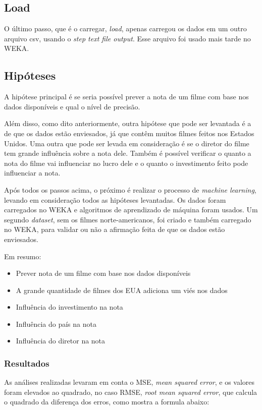 \subsection{Load}
O último passo, que é o carregar, \textit{load}, apenas carregou os dados em um outro arquivo csv, usando o \textit{step text file output}. Esse arquivo foi usado mais tarde no WEKA.

\subsection{Hipóteses}
A hipótese principal é se seria possível prever a nota de um filme com base nos dados disponíveis e qual o nível de precisão.

Além disso, como dito anteriormente, outra hipótese que pode ser levantada é a de que os dados estão enviesados, já que contêm muitos filmes feitos nos Estados Unidos. Uma outra que pode ser levada em consideração é se o diretor do filme tem grande influência sobre a nota dele. Também é possível verificar o quanto a nota do filme vai influenciar no lucro dele e o quanto o investimento feito pode influenciar a nota.

Após todos os passos acima, o próximo é realizar o processo de \textit{machine learning}, levando em consideração todos as hipóteses levantadas. Os dados foram carregados no WEKA e algoritmos de aprendizado de máquina foram usados. Um segundo \textit{dataset}, sem os filmes norte-americanos, foi criado e também carregado no WEKA, para validar ou não a afirmação feita de que os dados estão enviesados. 

Em resumo:

\begin{itemize}
    \item Prever nota de um filme com base nos dados disponíveis
    \item A grande quantidade de filmes dos EUA adiciona um viés nos dados
    \item Influência do investimento na nota
    \item Influência do país na nota
    \item Influência do diretor na nota
\end{itemize}

\subsubsection{Resultados}
As análises realizadas levaram em conta o MSE, \textit{mean squared error}, e os valores foram elevados ao quadrado, no caso RMSE, \textit{root mean squared error}, que calcula o quadrado da diferença dos erros, como mostra a formula abaixo:

